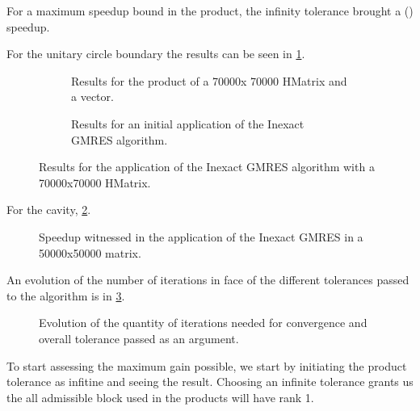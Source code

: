 For a maximum speedup bound in the product, the infinity tolerance brought a () speedup.

For the unitary circle boundary the results can be seen in \ref{fig:Helmholtz_circle_results}.

\begin{figure}[h!]
    \centering
    \begin{subfigure}[b]{0.45\linewidth}
        
        \caption{Results for the product of a 70000x 70000 HMatrix and a vector.}
    \end{subfigure}
    \begin{subfigure}[b]{0.45\linewidth}
        
        \caption{Results for an initial application of the Inexact GMRES algorithm.}
    \end{subfigure}
    \caption{Results for the application of the Inexact GMRES algorithm with a 70000x70000 HMatrix.}
    \label{fig:Helmholtz_circle_results}
\end{figure}


For the cavity, \ref{fig:cavity_results}.

\begin{figure}[h!]
    \centering
    
    \caption{Speedup witnessed in the application of the Inexact GMRES in a 50000x50000 matrix.}
    \label{fig:cavity_results}
\end{figure}

An evolution of the number of iterations in face of the different tolerances passed to the algorithm is in \ref{fig:cavity_iterations}.

\begin{figure}[h!]
    \centering
    
    \caption{Evolution of the quantity of iterations needed for convergence and overall tolerance passed as an argument.}
    \label{fig:cavity_iterations}
\end{figure}



To start assessing the maximum gain possible, we start by initiating the product tolerance as infitine and seeing the result. Choosing an infinite tolerance grants us the all admissible block used in the products will have rank 1.


